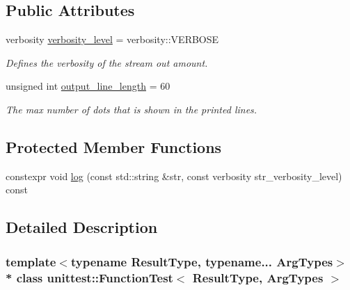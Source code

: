 \subsection*{Public Attributes}
\begin{DoxyCompactItemize}
\item 
verbosity \hyperlink{classunittest_1_1_function_test_af69f9db50f85c841c96d87757719fc37}{verbosity\+\_\+level} = verbosity\+::\+V\+E\+R\+B\+O\+SE\hypertarget{classunittest_1_1_function_test_af69f9db50f85c841c96d87757719fc37}{}\label{classunittest_1_1_function_test_af69f9db50f85c841c96d87757719fc37}

\begin{DoxyCompactList}\small\item\em Defines the verbosity of the stream out amount. \end{DoxyCompactList}\item 
unsigned int \hyperlink{classunittest_1_1_function_test_aa9959c19872e086b9401382cb381f552}{output\+\_\+line\+\_\+length} = 60\hypertarget{classunittest_1_1_function_test_aa9959c19872e086b9401382cb381f552}{}\label{classunittest_1_1_function_test_aa9959c19872e086b9401382cb381f552}

\begin{DoxyCompactList}\small\item\em The max number of dots that is shown in the printed lines. \end{DoxyCompactList}\end{DoxyCompactItemize}
\subsection*{Protected Member Functions}
\begin{DoxyCompactItemize}
\item 
constexpr void \hyperlink{classunittest_1_1_function_test_a3dfca16f618a14bf9eb1ea14defee4d6}{log} (const std\+::string \&str, const verbosity str\+\_\+verbosity\+\_\+level) const 
\end{DoxyCompactItemize}


\subsection{Detailed Description}
\subsubsection*{template$<$typename Result\+Type, typename... Arg\+Types$>$\\*
class unittest\+::\+Function\+Test$<$ Result\+Type, Arg\+Types $>$}

